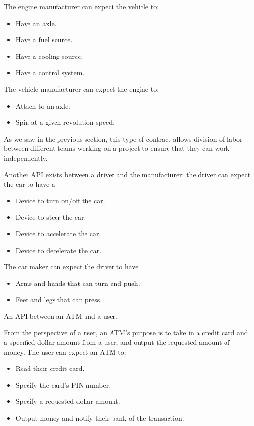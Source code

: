 The engine manufacturer can expect the vehicle to:
\begin{itemize}
	\item Have an axle.
	\item Have a fuel source.
	\item Have a cooling source.
	\item Have a control system.
\end{itemize}

The vehicle manufacturer can expect the engine to:
\begin{itemize}
	\item Attach to an axle.
	\item Spin at a given revolution speed.
\end{itemize}

As we saw in the previous section, this type of contract allows division of labor between different teams working on a project to ensure that they can work independently.

Another API exists between a driver and the manufacturer: the driver can expect the car to have a:
\begin{itemize}
	\item Device to turn on/off the car.
	\item Device to steer the car.
	\item Device to accelerate the car.
	\item Device to decelerate the car.
\end{itemize}

The car maker can expect the driver to have
\begin{itemize}
	\item Arms and hands that can turn and push.
	\item Feet and legs that can press.
\end{itemize}

\begin{example}
An API between an ATM and a user. 
\end{example}

From the perspective of a user, an ATM's purpose is to take in a credit card and a specified dollar amount from a user, and output the requested amount of money. The user can expect an ATM to:
\begin{itemize}
	\item Read their credit card.
	\item Specify the card's PIN number.
	\item Specify a requested dollar amount.
	\item Output money and notify their bank of the transaction.
\end{itemize}

